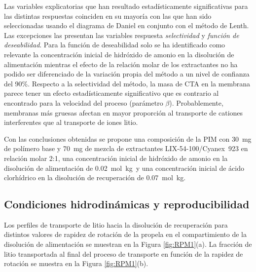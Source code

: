 Las variables explicatorias que han resultado estadísticamente significativas para las distintas respuestas coinciden en su mayoría con las que han sido seleccionadas usando el diagrama de Daniel en conjunto con el método de Lenth. Las excepciones las presentan las variables respuesta \textit{selectividad} y \textit{función de deseabilidad}. Para la función de deseabilidad solo se ha identificado como relevante la concentración inicial de hidróxido de amonio en la disolución de alimentación mientras el efecto de la relación molar de los extractantes no ha podido ser diferenciado de la variación propia del método a un nivel de confianza del 90\%. Respecto a la selectividad del método, la masa de CTA en la membrana parece tener un efecto estadísticamente significativo que es contrario al encontrado para la velocidad del proceso (parámetro $\beta$). Probablemente, membranas más gruesas afectan en mayor proporción al transporte de cationes interferentes que al transporte de iones litio.

Con las conclusiones obtenidas se propone una composición de la \ac{PIM} con 30~mg de polímero base y 70~mg de mezcla de extractantes LIX-54-100/Cyanex~923 en relación molar 2:1, una concentración inicial de hidróxido de amonio en la disolución de alimentación de 0.02~mol~kg\mnn\ y una concentración inicial de ácido clorhídrico en la disolución de recuperación de 0.07~mol~kg\mnn.

\subsection{Condiciones hidrodinámicas y reproducibilidad}\label{sec:reprod}
Los perfiles de transporte de litio hacia la disolución de recuperación para distintos valores de rapidez de rotación de la propela en el compartimiento de la disolución de alimentación se muestran en la Figura \ref{fig:RPM1}(a). La fracción de litio transportada al final del proceso de transporte en función de la rapidez de rotación se muestra en la Figura \ref{fig:RPM1}(b). 

